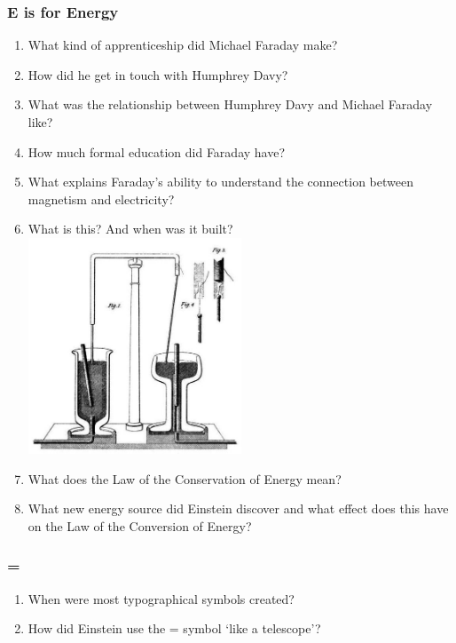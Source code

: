 \subsubsection*{E is for Energy}
\begin{enumerate}  
\item What kind of apprenticeship did Michael Faraday make?
\item How did he get in touch with Humphrey Davy?
\item What was the relationship between Humphrey Davy and Michael Faraday like?
\item How much formal education did Faraday have?
\item What explains Faraday’s ability to understand the connection between magnetism and electricity?
\item What is this? And when was it built? \\
\includegraphics[width=0.5\textwidth]{images/image-part-1-question-6.jpg}\par\vspace{1cm}
\item What does the Law of the Conservation of Energy mean?
\item What new energy source did Einstein discover and what effect does this have on the Law of the Conversion of Energy?
\end{enumerate}

\subsubsection*{=}
\begin{enumerate}  
\item When were most typographical symbols created?
\item How did Einstein use the = symbol ‘like a telescope’?
\end{enumerate}

